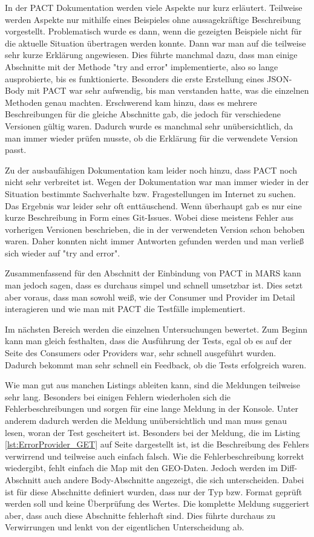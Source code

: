 \documentclass{llncs}
\begin{document}
In der PACT Dokumentation werden viele Aspekte nur kurz erläutert. Teilweise werden Aspekte nur mithilfe eines Beispieles ohne aussagekräftige Beschreibung vorgestellt. Problematisch wurde es dann, wenn die gezeigten Beispiele nicht für die aktuelle Situation übertragen werden konnte. Dann war man auf die teilweise sehr kurze Erklärung angewiesen. Dies führte manchmal dazu, dass man einige Abschnitte mit der Methode "try and error" implementierte, also so lange ausprobierte, bis es funktionierte. Besonders die erste Erstellung eines JSON-Body mit PACT war sehr aufwendig, bis man verstanden hatte, was die einzelnen Methoden genau machten. Erschwerend kam hinzu, dass es mehrere Beschreibungen für die gleiche Abschnitte gab, die jedoch für verschiedene Versionen gültig waren. Dadurch wurde es manchmal sehr unübersichtlich, da man immer wieder prüfen musste, ob die Erklärung für die verwendete Version passt.

Zu der ausbaufähigen Dokumentation kam leider noch hinzu, dass PACT noch nicht sehr verbreitet ist. Wegen der Dokumentation war man immer wieder in der Situation bestimmte Sachverhalte bzw. Fragestellungen im Internet zu suchen. Das Ergebnis war leider sehr oft enttäuschend. Wenn überhaupt gab es nur eine kurze Beschreibung in Form eines Git-Issues. Wobei diese meistens Fehler aus vorherigen Versionen beschrieben, die in der verwendeten Version schon behoben waren. Daher konnten nicht immer Antworten gefunden werden und man verließ sich wieder auf "try and error".

Zusammenfassend für den Abschnitt der Einbindung von PACT in MARS kann man jedoch sagen, dass es durchaus simpel und schnell umsetzbar ist. Dies setzt aber voraus, dass man sowohl weiß, wie der Consumer und Provider im Detail interagieren und wie man mit PACT die Testfälle implementiert.

Im nächsten Bereich werden die einzelnen Untersuchungen bewertet. Zum Beginn kann man gleich festhalten, dass die Ausführung der Tests, egal ob es auf der Seite des Consumers oder Providers war, sehr schnell ausgeführt wurden. Dadurch bekommt man sehr schnell ein Feedback, ob die Tests erfolgreich waren. 

Wie man gut aus manchen Listings ableiten kann, sind die Meldungen teilweise sehr lang. Besonders bei einigen Fehlern wiederholen sich die Fehlerbeschreibungen und sorgen für eine lange Meldung in der Konsole. Unter anderem dadurch werden die Meldung unübersichtlich und man muss genau lesen, woran der Test gescheitert ist. Besonders bei der Meldung, die im Listing \ref{lst:ErrorProvider_GET} auf Seite \pageref{lst:ErrorProvider_GET} dargestellt ist, ist die Beschreibung des Fehlers verwirrend und teilweise auch einfach falsch. Wie die Fehlerbeschreibung korrekt wiedergibt, fehlt einfach die Map mit den GEO-Daten. Jedoch werden im Diff-Abschnitt auch andere Body-Abschnitte angezeigt, die sich unterscheiden. Dabei ist für diese Abschnitte definiert wurden, dass nur der Typ bzw. Format geprüft werden soll und keine Überprüfung des Wertes. Die komplette Meldung suggeriert aber, dass auch diese Abschnitte fehlerhaft sind. Dies führte durchaus zu Verwirrungen und lenkt von der eigentlichen Unterscheidung ab. 
 
\end{document}
